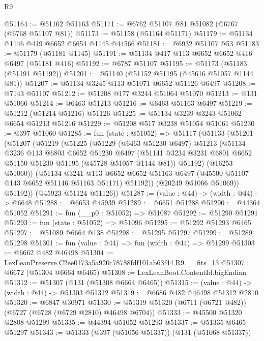 \begin{lexlean}{R9}
\begin{coremodule}
@51164 := @51162 @51163
@51171 := @6762 @51107 @81 @51082 (@6767 (@6768 @51107 @81))
@51173 := @51158 (@51164 @51171)
@51179 := @51134 @1146 @419 @6652 @6654 @1145 @44566
@51181 := @6932 @51107 @53
@51183 := @51179 (@51181 @1145)
@51191 := @51134 @417 @113 @6652 @6652 @416 @6497 (@51181 @416)
@51192 := @6787 @51107
@51195 := @51173 (@51183 (@51191 @51192))
@51201 := @51140 (@51152 @51195 (@45616 @51057 @1144 @81))
@51207 := @51134 @3245 @113 @51071 @6652 @51126 @6497
@51208 := @7143 @51107
@51212 := @51208 @177 @3244 @51064 @51070
@51213 := @131 @51066
@51214 := @6463 @51213
@51216 := @6463 @51163 @6497
@51219 := @51212 (@51214 @51216) @51126
@51225 := @51134 @3239 @3243 @51062 @6654 @51213 @51216
@51229 := @51208 @517 @3238 @51054 @51061
@51230 := @397 @51060
@51285 := fun (state : @51052) =>
  @51117
    (@51133
      (@51201
        (@51207
          (@51219
            (@51225
              (@51229
                (@6463 @51230 @6497)
                @51213
                (@51134
                  @3236
                  @113
                  @6803
                  @6652
                  @51230
                  @6497
                  (@51141 @3234 @3231 @6801 @6652 @51150 @51230 @51195 (@45728 @51057 @1144 @81))
                  @51192)
                (@16253 @51060))
              (@51134
                @3241
                @113
                @6652
                @6652
                @51163
                @6497
                (@45500 @51107 @143 @6652 @51146 @51163 @51171)
                @51192))
            (@20249 @51066 @51069))
          @51192))
      (@45923 @51124 @51126))
@51287 := (value : @44) -> (width : @44) -> @6648
@51288 := @6653 @45939
@51289 := @6651 @51288
@51290 := @44364 @51052
@51291 := fun (__p0 : @51052) => @51087
@51292 := @51290 @51291
@51293 := fun (state : @51052) => @51096
@51295 := @51292 @51293 @6465
@51297 := @51089 @6664 @138
@51298 := @51295 @51297
@51299 := @51289 @51298
@51301 := fun (value : @44) => fun (width : @44) => @51299
@51303 := @6662 @482 @46498
@51304 := LexLeanPreserve.C2ee0173a5a920c78788fdf101ab63f44.R9.__fits_13
@51307 := @6672 (@51304 @6664 @6465)
@51308 := LexLeanBoot.ContentId.bigEndian
@51312 := @51307 (@131 (@51308 @6664 @6465))
@51315 := (value : @44) -> (width : @44) -> @51303 @51312
@51319 := @6686 @482 @46498 @51312 @2810
@51320 := @6847 @30971
@51330 := @51319 @51320 (@6711 (@6721 @482)) (@6727 (@6728 (@6729 @2810) @46498 @6704))
@51333 := @45500 @51320 @2808 @51299
@51335 := @44394 @51052 @51293
@51337 := @51335 @6465 @51297
@51343 := @51333 (@397 (@51056 @51337)) (@131 (@51068 @51337))

\end{coremodule}
\end{lexlean}

